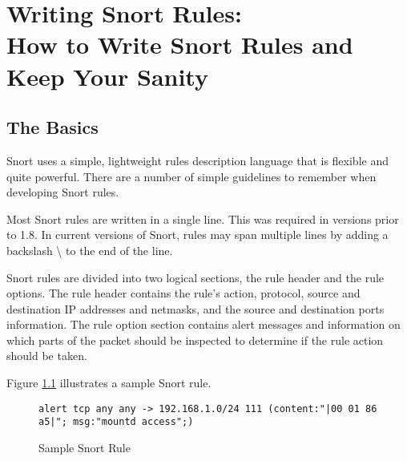 \documentclass[english]{report}
\begin{document}


\clearpage
\chapter{Writing Snort Rules: \protect \\
How to Write Snort Rules and Keep Your Sanity\label{Writing Snort Rules}}

\section{The Basics}

Snort uses a simple, lightweight rules description language that is flexible
and quite powerful. There are a number of simple guidelines to remember when
developing Snort rules.

Most Snort rules are written in a single line. This was required in versions
prior to 1.8. In current versions of Snort, rules may span multiple lines by
adding a backslash \textbackslash{} to the end of the line. 

Snort rules are divided into two logical sections, the rule header and the rule
options. The rule header contains the rule's action, protocol, source and
destination IP addresses and netmasks, and the source and destination ports
information. The rule option section contains alert messages and information on
which parts of the packet should be inspected to determine if the rule action
should be taken.

Figure \ref{Sample Snort Rule} illustrates a sample Snort rule.

\begin{center}
\begin{figure}[!hbpt]
\begin{verbatim}
alert tcp any any -> 192.168.1.0/24 111 (content:"|00 01 86 a5|"; msg:"mountd access";)
\end{verbatim}

\caption{Sample Snort Rule\label{Sample Snort Rule}}
\end{figure}
\end{center}
\end{document}
